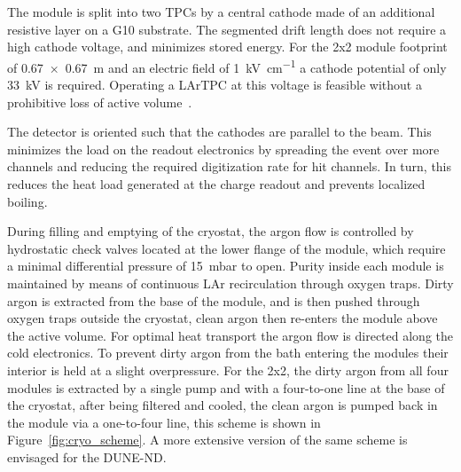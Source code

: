 The module is split into two TPCs by a central cathode made of an additional resistive layer on a G10 substrate. The segmented drift length does not require a high cathode voltage, and minimizes stored energy. For the 2x2 module footprint of \SI{0.67 x 0.67}{\metre} and an electric field of \SI{1}{\kilo\volt\per\centi\metre} a cathode potential of only \SI{33}{\kilo\volt} is required. Operating a LArTPC at this voltage is feasible without a prohibitive loss of active volume~\cite{argontube}.

The detector is oriented such that the cathodes are parallel to the beam. This minimizes the load on the readout electronics by spreading the event over more channels and reducing the required digitization rate for hit channels. In turn, this reduces the heat load generated at the charge readout and prevents localized boiling.

During filling and emptying of the cryostat, the argon flow is controlled by hydrostatic check valves located at the lower flange of the module, which require a minimal differential pressure of \SI{15}{\milli\bar} to open. Purity inside each module is maintained by means of continuous LAr recirculation through oxygen traps. Dirty argon is extracted from the base of the module, and is then pushed through oxygen traps outside the cryostat, clean argon then re-enters the module above the active volume. For optimal heat transport the argon flow is directed along the cold electronics. To prevent dirty argon from the bath entering the modules their interior is held at a slight overpressure. For the 2x2, the dirty argon from all four modules is extracted by a single pump and with a four-to-one line at the base of the cryostat, after being filtered and cooled, the clean argon is pumped back in the module via a one-to-four line, this scheme is shown in Figure~\ref{fig:cryo_scheme}. A more extensive version of the same scheme is envisaged for the DUNE-ND.  

